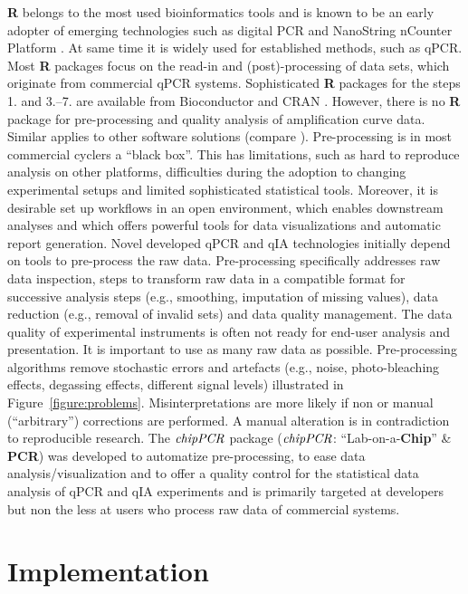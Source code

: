 \documentclass[twocolumn]{bmcart}%
\begin{document}
  \textbf{R} belongs to the most used bioinformatics tools and is known to be an 
early adopter of emerging technologies such as digital PCR and  NanoString 
nCounter Platform \cite{waggott_2012,pabinger_2014}. At same time it is widely 
used for established methods, such as qPCR. Most \textbf{R} packages focus on 
the read-in and (post)-processing of data sets, which originate from commercial 
qPCR systems. Sophisticated \textbf{R} packages for the steps 1. and 3.--7. are 
available from Bioconductor and CRAN 
\cite{pabinger_2014,Dvinge_2009,perkins_2012,heckmann_2011,Zhang_2010, 
mccall_2014,gehlenborg_2013,huntley_2013,zhang_2013}. However, 
there is no \textbf{R} package for pre-processing and quality analysis of 
amplification curve data. Similar applies to other software solutions (compare 
\cite{pabinger_2014}). Pre-processing is in most commercial cyclers a ``black 
box''. This has limitations, such as hard to reproduce analysis on other 
platforms, difficulties during the adoption to changing experimental setups and 
limited sophisticated statistical tools. Moreover, it is desirable set up 
workflows in an open environment, which enables downstream analyses and which 
offers powerful tools for data visualizations and automatic report generation. 
Novel developed qPCR and qIA technologies initially depend on tools to 
pre-process the raw data. Pre-processing specifically addresses raw data 
inspection, steps to transform raw data in a compatible format for successive 
analysis steps (e.g., smoothing, imputation of missing values), data reduction 
(e.g., removal of invalid sets) and data quality management. The data quality of 
experimental instruments is often not ready for end-user analysis and 
presentation. It is important to use as many raw data as possible. 
Pre-processing algorithms remove stochastic errors and artefacts (e.g., noise, 
photo-bleaching effects, degassing effects, different signal levels) illustrated 
in Figure~\ref{figure:problems}. Misinterpretations are more likely if non or 
manual (``arbitrary'') corrections are performed. A manual alteration is in 
contradiction to reproducible research. The $\emph{chipPCR}$ package 
($\emph{chipPCR}$: ``Lab-on-a-\textbf{Chip}'' \& \textbf{PCR}) was developed to 
automatize pre-processing, to ease data analysis/visualization and to offer a 
quality control for the statistical data analysis of qPCR and qIA experiments 
and is primarily targeted at developers but non the less at users who process 
raw data of commercial systems. 


\section*{Implementation}
\end{document}
